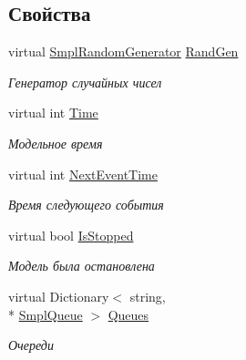 \subsection*{Свойства}
\begin{DoxyCompactItemize}
\item 
virtual \hyperlink{class_s_m_p_l_sharp_1_1_utils_1_1_smpl_random_generator}{Smpl\-Random\-Generator} \hyperlink{class_s_m_p_l_sharp_1_1_smpl_model_a0f7a947d68471f69ba6afaf03ec15093}{Rand\-Gen}
\begin{DoxyCompactList}\small\item\em Генератор случайных чисел \end{DoxyCompactList}\item 
virtual int \hyperlink{class_s_m_p_l_sharp_1_1_smpl_model_a091e0759cad46e82a02ff253a232a37d}{Time}
\begin{DoxyCompactList}\small\item\em Модельное время \end{DoxyCompactList}\item 
virtual int \hyperlink{class_s_m_p_l_sharp_1_1_smpl_model_a83863cdbfb43901325e891a65fd27d40}{Next\-Event\-Time}
\begin{DoxyCompactList}\small\item\em Время следующего события \end{DoxyCompactList}\item 
virtual bool \hyperlink{class_s_m_p_l_sharp_1_1_smpl_model_a5427e31d8b72ff5823518e5eff801fd3}{Is\-Stopped}
\begin{DoxyCompactList}\small\item\em Модель была остановлена \end{DoxyCompactList}\item 
virtual Dictionary$<$ string, \\*
\hyperlink{class_s_m_p_l_sharp_1_1_objects_1_1_smpl_queue}{Smpl\-Queue} $>$ \hyperlink{class_s_m_p_l_sharp_1_1_smpl_model_a1bbb9a6e7a49ca06902fa90aa611c719}{Queues}
\begin{DoxyCompactList}\small\item\em Очереди \end{DoxyCompactList}\item 

\end{DoxyCompactItemize}
